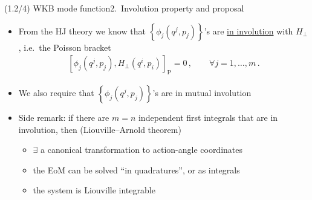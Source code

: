 \documentclass[mathserif]{beamer}
\newcommand{\sbr}[1]{{\left[#1\right]}}
\newcommand{\cbr}[1]{{\left\{#1\right\}}}
\newcommand{\rfun}[2]{#1\mathopen{}\left(#2\right)\mathclose{}}
\begin{document}
\begin{frame}{(1.2/4) WKB mode function}{2.\ Involution property and proposal}
\begin{itemize}
    \item From the HJ theory we know that $\cbr{\rfun{\phi_j}{q^j, p_j}}$'s are \underline{in involution} with $H_\perp$, i.e.\ the Poisson bracket
\begin{align}
    \sbr{\rfun{\phi_j}{q^j, p_j}, \rfun{H_\perp}{q^i, p_i}}_\text{P} = 0\,,
    \qquad \forall j = 1, \ldots, m\,.
\end{align}
\item
We also \alert{require} that $\cbr{\rfun{\phi_j}{q^j, p_j}}$'s are in mutual
involution
\end{itemize}

\begin{itemize}
    \item Side remark: if there are $m=n$ independent first integrals that are in involution, then (Liouville--Arnold theorem) 
    \begin{itemize}
        \item $\exists$ a canonical transformation to action-angle coordinates
        \item the EoM can be solved ``in quadratures'', or as integrals
        \item the system is Liouville integrable
    \end{itemize}
\end{itemize}
\end{frame}
\end{document}
